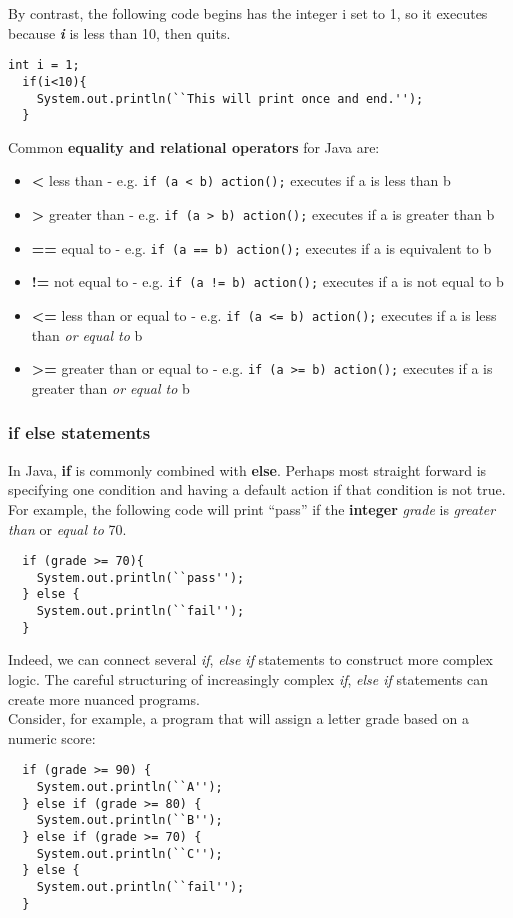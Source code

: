 \documentclass{article}
\begin{document}
\begin{flushleft}
\begin{verbatim}
\end{verbatim}

By contrast, the following code begins has the integer i set to 1, so it executes because \emph{\textbf{i}} is less than 10, then quits.

\begin{verbatim}
int i = 1; 
  if(i<10){
    System.out.println(``This will print once and end.'');
  }

\end{verbatim}

\noindent Common \textbf{equality and relational operators} for Java are:
\begin{itemize}
\item{\textbf{<}} less than - e.g. \texttt{if (a < b){ action();}} executes if a is less than b
\item{\textbf{>}} greater than - e.g. \texttt{if (a > b){ action();}} executes if a is greater than b
\item{\textbf{==}} equal to - e.g. \texttt{if (a == b){ action();}} executes if a is equivalent to b
\item{\textbf{!=}} not equal to - e.g. \texttt{if (a != b){ action();}} executes if a is not equal to b
\item{\textbf{<=}} less than or equal to - e.g. \texttt{if (a <= b){ action();}} executes if a is less than \emph{or equal to} b
\item{\textbf{>=}} greater than or equal to - e.g. \texttt{if (a >= b){ action();}} executes if a is greater than \emph{or equal to} b
\end{itemize}

\subsubsection{\textbf{if else} statements}
In Java, \textbf{if} is commonly combined with \textbf{else}.
Perhaps most straight forward is specifying one condition and having a default action if that condition is not true.
For example, the following code will print ``pass'' if the \textbf{integer} \emph{grade} is \emph{greater than} or \emph{equal to} 70.

\begin{verbatim}
  if (grade >= 70){
    System.out.println(``pass'');
  } else {
    System.out.println(``fail'');
  }
\end{verbatim}

\noindent Indeed, we can connect several \emph{if}, \emph{else if} statements to construct more complex logic. The careful structuring of increasingly complex \emph{if}, \emph{else if} statements can create more nuanced programs. \\
Consider, for example, a program that will assign a letter grade based on a numeric score:\\
\begin{verbatim}
  if (grade >= 90) {
    System.out.println(``A'');
  } else if (grade >= 80) {
    System.out.println(``B'');
  } else if (grade >= 70) {
    System.out.println(``C'');
  } else {
    System.out.println(``fail'');
  }
\end{verbatim}


\end{flushleft}
\end{document}
